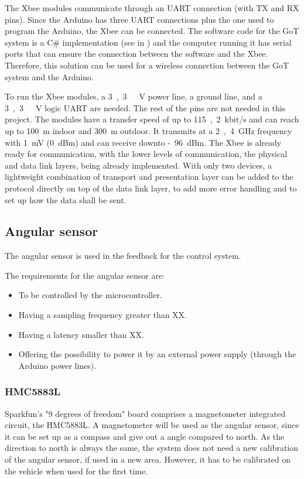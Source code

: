 
The Xbee modules communicate through an UART connection (with TX and RX pins). Since the Arduino has three UART connections plus the one used to program the Arduino, the Xbee can be connected. The software code for the GoT system is a C\# implementation (see in ) and the computer running it has serial ports that can ensure the connection between the software and the Xbee. Therefore, this solution can be used for a wireless connection between the GoT system and the Arduino.

To run the Xbee modules, a \si{3,3\ V} power line, a ground line, and a \si{3,3\ V} logic UART are needed. The rest of the pins are not needed in this project. The modules have a transfer speed of up to \si{115,2 kbit/s} and can reach up to \si{100 m} indoor and \si{300 m} outdoor. It transmits at a \si{2,4 GHz} frequency with \si{1 mV} (\si{0 dBm}) and can receive downto \si{-96 dBm}. The Xbee is already ready for communication, with the lower levels of communication, the physical and data link layers, being already implemented. With only two devices, a lightweight combination of transport and presentation layer can be added to the protocol directly on top of the data link layer, to add more error handling and to set up how the data shall be sent.



\subsection{Angular sensor}
The angular sensor is used in the feedback for the control system.

The requirements for the angular sensor are:
\begin{itemize}
\item To be controlled by the microcontroller.
\item Having a sampling frequency greater than XX. 
\item Having a latency smaller than XX. 
\item Offering the possibility to power it by an external power supply (through the Arduino power lines).
\end{itemize}

\subsubsection{HMC5883L}
Sparkfun's "9 degrees of freedom" board comprises a magnetometer integrated circuit, the HMC5883L\cite{HMC5883L}. A magnetometer will be used as the angular sensor, since it can be set up as a compass and give out a angle compared to north. As the direction to north is always the same, the system does not need a new calibration of the angular sensor, if used in a new area. However, it has to be calibrated on the vehicle when used for the first time.

